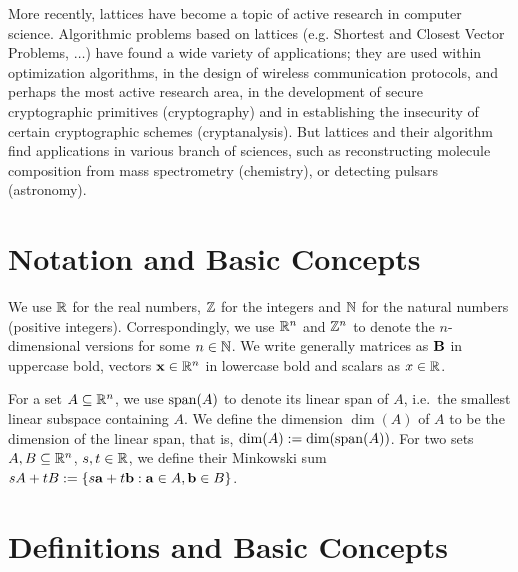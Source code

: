 More recently, lattices have become a topic of active research in computer science. Algorithmic problems based on lattices (e.g. Shortest and Closest Vector Problems, $\dots$) have found a wide variety of applications; they are used within optimization algorithms, in the design of wireless communication protocols, and perhaps the most active research area, in the development of secure cryptographic primitives (cryptography) and in establishing the insecurity of certain cryptographic schemes (cryptanalysis).  But lattices and their algorithm find applications in various branch of sciences, such as reconstructing molecule composition from mass spectrometry (chemistry), or detecting pulsars (astronomy). 


\section{Notation and Basic Concepts}

We use $\mathbb{R}$ for the real numbers, $\mathbb{Z}$ for the integers and $\mathbb{N}$ for the natural
numbers (positive integers). Correspondingly, we use $\mathbb{R}^n$ and $\mathbb{Z}^n$ to denote
the $n$-dimensional versions for some $n \in \mathbb{N}$. We write generally matrices as
$\mathbf{B}$ in uppercase bold, vectors $\mathbf{x} \in \mathbb{R}^n$ in lowercase bold and
scalars as $x \in \mathbb{R}$. 


For a set $A \subseteq \mathbb{R}^n$, we use $\mathrm{span}(A)$ to denote its linear span of
$A$, i.e.~the smallest linear subspace containing $A$. We define the dimension
$\dim(A)$ of $A$ to be the dimension of the linear span, that is, $\dim(A)
:= \dim(\mathrm{span}(A))$. 
For two sets $A,B \subseteq \mathbb{R}^n$, $s,t \in \mathbb{R}$, we
define their Minkowski sum $sA + tB := \{{s\mathbf{a} + t \mathbf{b}: \mathbf{a} \in
A, \mathbf{b} \in B}\}$.  

\section{Definitions and Basic Concepts}

